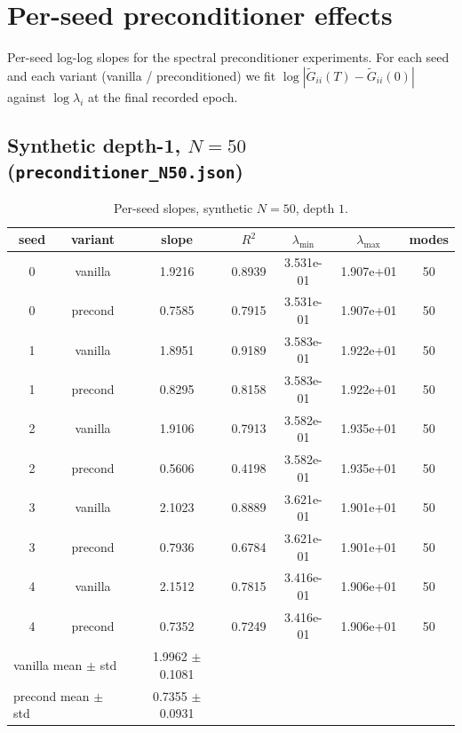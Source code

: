 \section{Per-seed preconditioner effects}
\label{app:precond-perseed}

Per-seed log-log slopes for the spectral preconditioner experiments. For each seed and each variant (vanilla / preconditioned) we fit $\log |\widetilde{G}_{ii}(T) - \widetilde{G}_{ii}(0)|$ against $\log \lambda_i$ at the final recorded epoch.

\subsection{Synthetic depth-1, $N=50$ (\texttt{preconditioner\_N50.json})}
\begin{table}[H]
\centering
\caption{Per-seed slopes, synthetic $N=50$, depth $1$.}
\label{tab:precond-N50}
\begin{tabular}{c c c c c c c}
\toprule
seed & variant & slope & $R^2$ & $\lambda_{\min}$ & $\lambda_{\max}$ & modes \\
\midrule
0 & vanilla & 1.9216 & 0.8939 & 3.531e-01 & 1.907e+01 & 50 \\
0 & precond & 0.7585 & 0.7915 & 3.531e-01 & 1.907e+01 & 50 \\
1 & vanilla & 1.8951 & 0.9189 & 3.583e-01 & 1.922e+01 & 50 \\
1 & precond & 0.8295 & 0.8158 & 3.583e-01 & 1.922e+01 & 50 \\
2 & vanilla & 1.9106 & 0.7913 & 3.582e-01 & 1.935e+01 & 50 \\
2 & precond & 0.5606 & 0.4198 & 3.582e-01 & 1.935e+01 & 50 \\
3 & vanilla & 2.1023 & 0.8889 & 3.621e-01 & 1.901e+01 & 50 \\
3 & precond & 0.7936 & 0.6784 & 3.621e-01 & 1.901e+01 & 50 \\
4 & vanilla & 2.1512 & 0.7815 & 3.416e-01 & 1.906e+01 & 50 \\
4 & precond & 0.7352 & 0.7249 & 3.416e-01 & 1.906e+01 & 50 \\
\midrule
\multicolumn{2}{l}{vanilla mean $\pm$ std} & 1.9962 $\pm$ 0.1081 & & & & \\
\multicolumn{2}{l}{precond mean $\pm$ std} & 0.7355 $\pm$ 0.0931 & & & & \\
\bottomrule
\end{tabular}
\end{table}

